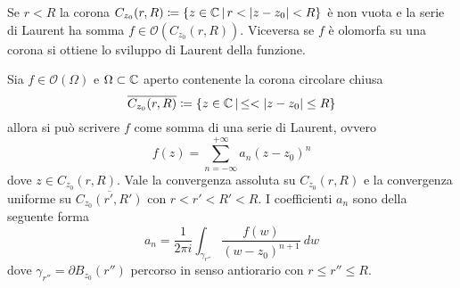 \begin{remark}
  Se $r < R$ la corona $C_{z_0}(r,R) \coloneqq \left\{ z \in \mathbb{C} \,\middle|\,
  r < |z - z_0|  < R \right\}$ è non vuota e la serie di Laurent ha somma $f \in
  \mathcal{O}(C_{z_0}(r,R))$. Viceversa se $f$ è olomorfa su una corona si
  ottiene lo sviluppo di Laurent della funzione.
  \label{rmk:reverso_card_holo_func}
\end{remark}

\begin{theorem}
  Sia $f \in \mathcal{O}(\Omega)$ e $\Omega \subset \mathbb{C}$ aperto contenente la
  corona circolare chiusa 
  \begin{equation*}
    \overline{C_{z_0}(r,R)} \coloneqq \left\{ z \in \mathbb{C} \,\middle|\,
            \le < |z - z_0| \le R \right\}
  \end{equation*}
  allora si può scrivere $f$ come somma di una serie di Laurent, ovvero 
  \begin{equation*}
    f(z) = \sum_{n = -\infty}^{+\infty} a_n(z-z_0)^n
  \end{equation*}
  dove $z \in C_{z_0}(r,R)$. Vale la convergenza assoluta su $C_{z_0}(r,R)$ e la
  convergenza uniforme su $\overline{C_{z_0}(r',R')}$ con $r < r' < R' < R$.
  I coefficienti $a_n$ sono della seguente forma 
  \begin{equation*}
    a_n = \frac{1}{2\pi i} \int_{\gamma_{r''}} \frac{f(w)}{(w-z_0)^{n+1}}\ dw
  \end{equation*}
  dove $\gamma_{r''} = \partial B_{z_0}(r'')$ percorso in senso antiorario con
  $r \le r'' \le R$.
  \label{thr:function_as_laurent_series}
\end{theorem}

